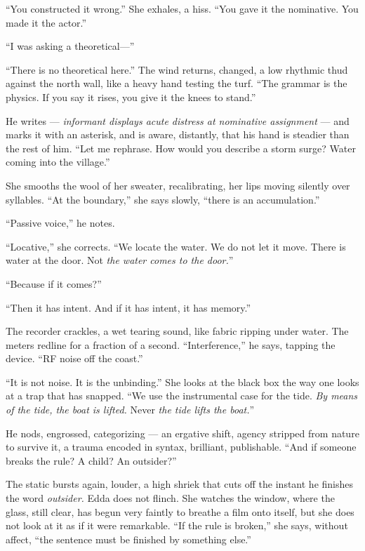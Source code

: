 \documentclass[11pt,oneside]{book}
\begin{document}
``You constructed it wrong.'' She exhales, a hiss. ``You gave it the
nominative. You made it the actor.''

``I was asking a theoretical---''

``There is no theoretical here.'' The wind returns, changed, a low
rhythmic thud against the north wall, like a heavy hand testing the
turf. ``The grammar is the physics. If you say it rises, you give it the
knees to stand.''

He writes --- \emph{informant displays acute distress at nominative
assignment} --- and marks it with an asterisk, and is aware, distantly,
that his hand is steadier than the rest of him. ``Let me rephrase. How
would you describe a storm surge? Water coming into the village.''

She smooths the wool of her sweater, recalibrating, her lips moving
silently over syllables. ``At the boundary,'' she says slowly, ``there
is an accumulation.''

``Passive voice,'' he notes.

``Locative,'' she corrects. ``We locate the water. We do not let it
move. There is water at the door. Not \emph{the water comes to the
door.}''

``Because if it comes?''

``Then it has intent. And if it has intent, it has memory.''

The recorder crackles, a wet tearing sound, like fabric ripping under
water. The meters redline for a fraction of a second. ``Interference,''
he says, tapping the device. ``RF noise off the coast.''

``It is not noise. It is the unbinding.'' She looks at the black box the
way one looks at a trap that has snapped. ``We use the instrumental case
for the tide. \emph{By means of the tide, the boat is lifted.} Never
\emph{the tide lifts the boat.}''

He nods, engrossed, categorizing --- an ergative shift, agency stripped
from nature to survive it, a trauma encoded in syntax, brilliant,
publishable. ``And if someone breaks the rule? A child? An outsider?''

The static bursts again, louder, a high shriek that cuts off the instant
he finishes the word \emph{outsider.} Edda does not flinch. She watches
the window, where the glass, still clear, has begun very faintly to
breathe a film onto itself, but she does not look at it as if it were
remarkable. ``If the rule is broken,'' she says, without affect, ``the
sentence must be finished by something else.''
\end{document}
